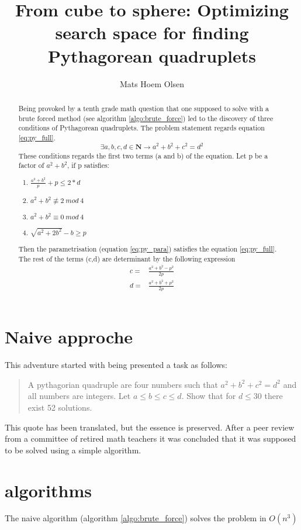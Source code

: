 \documentclass{article}
\title{From cube to sphere: Optimizing search space for finding Pythagorean quadruplets}
\author{Mats Hoem Olsen}
\begin{document}
\maketitle
\begin{abstract}
	Being provoked by a tenth grade math question that one supposed to solve with a brute forced method (see algorithm \ref{algo:brute_force}) led to the discovery of three conditions of Pythagorean quadruplets. The problem statement regards equation \ref{eq:py_full}.
	\begin{equation}\label{eq:py_full}
		\exists a,b,c,d \in \mathbf{N}\rightarrow a^2+b^2+c^2=d^2
	\end{equation}
	These conditions regards the first two terms (a and b) of the equation. Let p be a factor of $a^2+b^2$, if p satisfies:
	\begin{enumerate}
		\item $\frac{a^2+b^2}{p} + p \le 2*d$
		\item $a^2+b^2 \not\equiv 2\ mod\ 4 $
		\item $a^2+b^2 \equiv 0\ mod\ 4$
		\item $\sqrt{a^2+2b^2}-b \ge p$
	\end{enumerate}
	Then the parametrisation (equation \ref{eq:py_para}) satisfies the equation \ref{eq:py_full}. The rest of the terms (c,d) are determinant by the following expression
	$$
		\begin{matrix}
		c= & \frac{a^2+b^2-p^2}{2p}\\
		d= & \frac{a^2+b^2+p^2}{2p}
		\end{matrix}
	$$
\end{abstract}
\tableofcontents

\section{Naive approche}

This adventure started with being presented a task as follows:
\begin{quote}
	A pythagorian quadruple are four numbers such that $a^2+b^2+c^2=d^2$ and all numbers are integers. Let $a\le b \le c \le d$. Show that for $d \le 30$ there exist 52 solutions.
\end{quote}
This quote has been translated, but the essence is preserved. After a peer review from a committee of retired math teachers it was concluded that it was supposed to be solved using a simple algorithm.

\section{algorithms}
The naive algorithm (algorithm \ref{algo:brute_force}) solves the problem in $O(n^3)$ 
\end{document}

